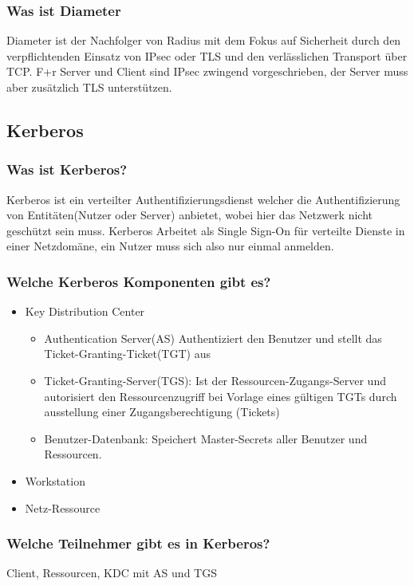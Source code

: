 	\subsubsection{Was ist Diameter}
	Diameter ist der Nachfolger von Radius mit dem Fokus auf Sicherheit durch den verpflichtenden Einsatz von IPsec oder TLS und den verlässlichen Transport über TCP. F+r Server und Client sind IPsec zwingend vorgeschrieben, der Server muss aber zusätzlich TLS unterstützen.
	
\subsection{Kerberos}
	\subsubsection{Was ist Kerberos?} 	
	Kerberos ist ein verteilter Authentifizierungsdienst welcher die Authentifizierung von Entitäten(Nutzer oder Server) anbietet, wobei hier das Netzwerk nicht geschützt sein muss. Kerberos Arbeitet als Single Sign-On für verteilte Dienste in einer Netzdomäne, ein Nutzer muss sich also nur einmal anmelden.
	
	\subsubsection{Welche Kerberos Komponenten gibt es?}
	\begin{itemize}
		\item Key Distribution Center
			\begin{itemize}
				\item Authentication Server(AS) Authentiziert den Benutzer und stellt das Ticket-Granting-Ticket(TGT) aus
				\item Ticket-Granting-Server(TGS): Ist der Ressourcen-Zugangs-Server und autorisiert den Ressourcenzugriff bei Vorlage eines gültigen TGTs durch ausstellung einer Zugangsberechtigung (Tickets)
				\item Benutzer-Datenbank: Speichert Master-Secrets aller Benutzer und Ressourcen.
			\end{itemize}
			\item Workstation
			\item Netz-Ressource
	\end{itemize}
	
	\subsubsection{Welche Teilnehmer gibt es in Kerberos?}
	Client, Ressourcen, KDC mit AS und TGS

